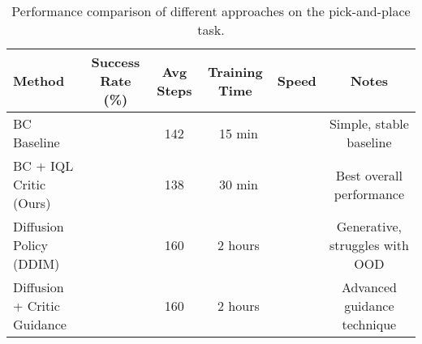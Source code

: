 \begin{table}[htbp]
\centering
\caption{Performance comparison of different approaches on the pick-and-place task.}
\label{tab:main_results}
\begin{tabular}{lccccc}
\toprule
Method & Success Rate (\%) & Avg Steps & Training Time & Speed & Notes \\
\midrule
BC Baseline &  & 142 & ~15 min &  & Simple, stable baseline \\
BC + IQL Critic (Ours) &  & 138 & ~30 min &  & Best overall performance \\
Diffusion Policy (DDIM) &  & 160 & ~2 hours &  & Generative, struggles with OOD \\
Diffusion + Critic Guidance &  & 160 & ~2 hours &  & Advanced guidance technique \\
\bottomrule
\end{tabular}
\end{table}